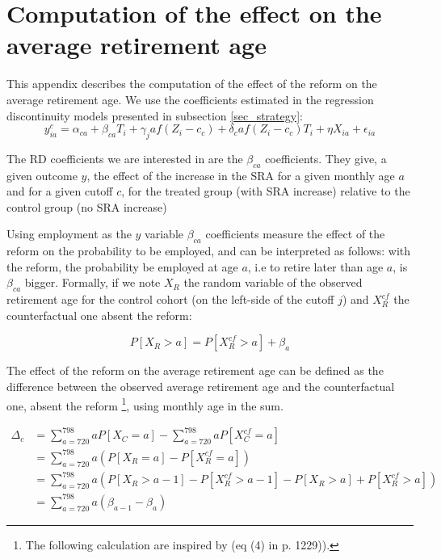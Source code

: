 \documentclass[12pt,a4paper]{article}
\begin{document}
\section{Computation of the effect on the average retirement age}\label{average_appendix}

\setcounter{table}{0}
\setcounter{equation}{0}
\setcounter{figure}{0}
\renewcommand{\thefigure}{A.\arabic{figure}}
\renewcommand{\thetable}{A.\arabic{table}}
\renewcommand{\theequation}{A.\arabic{equation}}


This appendix describes the computation of the effect of the reform on the average retirement age. We use the coefficients estimated in the regression discontinuity models presented in subsection \ref{sec_strategy}:	
\begin{equation}
	\label{eq_A1}
	y_{ia}^c = \alpha_{ca}   + \beta_{ca}  T_{i} + \gamma_ja f(Z_{i} - c_c)  + \delta_ca f(Z_{i} - c_c) T_{i} + \eta X_{ia} + \epsilon_{ia}
\end{equation}

The RD coefficients we are interested in are the $\beta_{ca}$ coefficients. They give, a given outcome $y$, the effect of the increase in the SRA for a given monthly age $a$ and for a given cutoff $c$, for the treated group (with SRA increase) relative to the control group (no SRA increase)

Using employment as the $y$ variable $\beta_{ca}$ coefficients measure the effect of the reform on the probability to be employed, and can be interpreted as follows: with the reform, the probability be employed at age $a$, i.e to retire later than age $a$, is $\beta_{ca}$  bigger. Formally, if we note $X_R$ the random variable of the observed retirement age for the control cohort (on the left-side of the cutoff  $j$) and $X_R^{cf}$ the counterfactual one absent the reform: 

\begin{equation}
	\label{eq_A2}
	P[X_R > a] = P[X_R^{cf} > a] + \beta_a 
\end{equation}

The effect of the reform on the average retirement age can be defined as the difference between the observed average retirement age and the counterfactual one, absent the reform \footnote{The following calculation are inspired by \cite{mastrobuoni_labor_2009} (eq (4) in p. 1229)).}, using monthly age in the sum.

\begin{align*}
	\Delta_c & =   \sum_{a = 720}^{798} a P[X_C = a] - \sum_{a = 720}^{798} a P[X_C^{cf} = a] \\
	& =\sum_{a = 720}^{798} a ( P[X_R = a] - P[X_R^{cf} = a]) \\
	& = \sum_{a = 720}^{798} a ( P[X_R >  a -1] - P[X_R^{cf}  > a-1] - P[X_R > a ] + P[X_R^{cf} > a]) \\
	& = \sum_{a = 720}^{798} a ( \beta_{a-1} - \beta_{a}) 
\end{align*}
\end{document}
